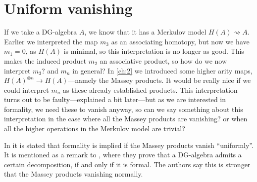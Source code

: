 \section{Uniform vanishing}




If we take a DG-algebra $A$, we know that it has a Merkulov model $H(A)\rightsquigarrow A$. Earlier we interpreted the map $m_3$ as an associating homotopy, but now we have $m_1 = 0$, as $H(A)$ is minimal, so this interpretation is no longer as good. This makes the induced product $m_2$ an associative product, so how do we now interpret $m_3$? and $m_n$ in general? In \cref{ch:2} we introduced some higher arity maps, $H(A)^{\otimes n}\longrightarrow H(A)$---namely the Massey products. It would be really nice if we could interpret $m_n$ as these already established products. This interpretation turns out to be faulty---explained a bit later---but as we are interested in formality, we need these to vanish anyway, so can we say something about this interpretation in the case where all the Massey products are vanishing? or when all the higher operations in the Merkulov model are trivial?

In \cite{DGMS} it is stated that formality is implied if the Massey products vanish ``uniformly''. It is mentioned as a remark to \cite[Theorem 4.1.]{DGMS}, where they prove that a DG-algebra admits a certain decomposition, if and only if it is formal. The authors say this is stronger that the Massey products vanishing normally. 




